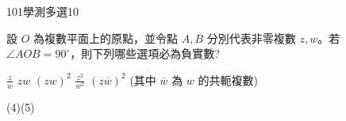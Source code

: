     \begin{QUESTION}
        \begin{ExamInfo}{101}{學測}{多選}{10}
        \end{ExamInfo}
        \begin{ExamAnsRateInfo}{36}{66}{27}{15}
        \end{ExamAnsRateInfo}
        \begin{QBODY}
            設 $O$ 為複數平面上的原點，並令點 $A,B$ 分別代表非零複數 $z,w$。若 $\angle AOB = 90^\circ$，則下列哪些選項必為負實數?
		\begin{QOPS} 
			\QOP $\frac{z}{w}$    
			\QOP $zw$    
			\QOP $(zw)^2$ 
			\QOP $\frac{z^2}{w^2}$ 
			\QOP $(z\overline{w})^2$ (其中 $\overline{w}$ 為 $w$ 的共軛複數)
		\end{QOPS}
        \end{QBODY}
        \begin{QFROMS}
        \end{QFROMS}
        \begin{QTAGS}\end{QTAGS}
        \begin{QANS}
            (4)(5)
        \end{QANS}
        \begin{QSOLLIST}
        \end{QSOLLIST}
        \begin{QEMPTYSPACE}
        \end{QEMPTYSPACE}
    \end{QUESTION}

